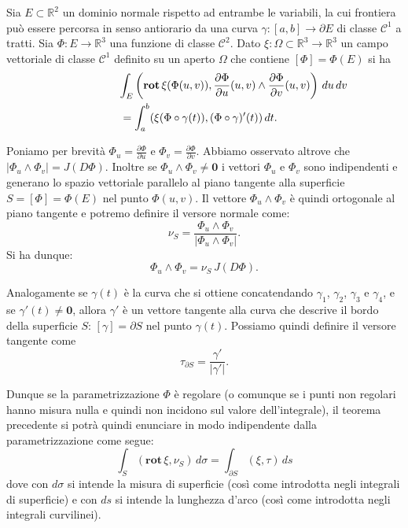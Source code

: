 \documentclass[italian,a4paper]{scrartcl}
\newcommand{\RR}{{\mathbb R}}
\newcommand{\C}{{\mathcal C}}
\renewcommand{\vec}{\mathbf}
\newcommand{\rot}{\mathbf{rot}\,}
\begin{document}
\begin{theorem}
Sia $E\subset \RR^2$ un dominio normale rispetto ad entrambe le
variabili, la cui frontiera può essere percorsa in senso antiorario
da una curva $\gamma\colon[a,b]\to \partial E$ di classe $\C^1$ a tratti.
Sia $\Phi\colon E \to \RR^3$ una funzione di classe $\mathcal C^2$.
Dato $\xi\colon \Omega\subset \RR^3\to \RR^3$
un campo vettoriale di classe $\mathcal C^1$ definito su un aperto
$\Omega$ che contiene $[\Phi]=\Phi(E)$
si ha
\begin{align*}
\lefteqn{\int_E \left(\rot \xi(\Phi(u,v)),\frac{\partial \Phi}{\partial u}(u,v) \wedge \frac{\partial \Phi}{\partial v}(u,v)\right)\, du\, dv}\\
&=
\int_a^b (\xi(\Phi\circ \gamma(t)), (\Phi\circ \gamma)'(t))\, dt.
\end{align*}
\end{theorem}
Poniamo per brevità $\Phi_u = \frac{\partial \Phi}{\partial u}$ e
$\Phi_v = \frac{\partial \Phi}{\partial v}$. Abbiamo osservato altrove
che $\lvert \Phi_u\wedge \Phi_v\rvert = J(D\Phi)$. Inoltre se $\Phi_u
\wedge \Phi_v \neq \vec 0$ i vettori $\Phi_u$ e $\Phi_v$ sono
indipendenti e generano lo spazio vettoriale parallelo al piano
tangente alla superficie $S=[\Phi]=\Phi(E)$ nel punto $\Phi(u,v)$.
Il vettore $\Phi_u \wedge \Phi_v$ è quindi ortogonale al piano
tangente e potremo definire il versore normale come:
\[
 \nu_S = \frac{\Phi_u \wedge \Phi_v}{\lvert \Phi_u \wedge \Phi_v\rvert}.
\]
Si ha dunque:
\[
 \Phi_u \wedge \Phi_v = \nu_S\, J(D\Phi).
\]

Analogamente se $\gamma(t)$ è la curva che si ottiene concatendando
$\gamma_1$, $\gamma_2$, $\gamma_3$ e $\gamma_4$, e se $\gamma'(t) \neq \vec
0$, allora $\gamma'$ è un vettore tangente alla curva che descrive il
bordo della superficie $S$: $[\gamma]=\partial S$ nel
punto $\gamma(t)$. Possiamo quindi definire il versore tangente come
\[
  \tau_{\partial S} = \frac{\gamma'}{\lvert \gamma'\rvert}.
\]

Dunque se la parametrizzazione $\Phi$ è regolare (o comunque se i
punti non regolari hanno misura nulla e quindi non incidono sul valore
dell'integrale),
il teorema precedente si potrà quindi enunciare in modo indipendente
dalla parametrizzazione come segue:
\[
\int_S (\rot \xi, \nu_S)\, d\sigma = \int_{\partial S} (\xi,\tau)\, ds
\]
dove con $d\sigma$ si intende la misura di superficie (così come
introdotta negli integrali di superficie) e con $ds$ si intende la
lunghezza d'arco (così come introdotta negli integrali curvilinei).
\end{document}
